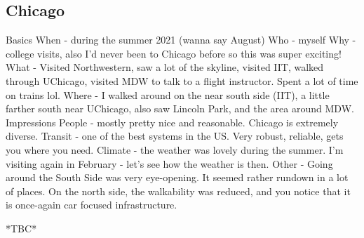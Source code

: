\documentclass{article}
\begin{document}
    \subsection{Chicago}
    \begin{outline}
        \1 Basics 
            \2 When - during the summer 2021 (wanna say August)
            \2 Who - myself 
            \2 Why - college visits, also I'd never been to Chicago before so this was super exciting!
            \2 What - Visited Northwestern, saw a lot of the skyline, visited IIT, walked through UChicago, visited MDW to talk to a flight instructor. Spent a lot of time on trains lol. 
            \2 Where - I walked around on the near south side (IIT), a little farther south near UChicago, also saw Lincoln Park, and the area around MDW. 
        \1 Impressions
            \2 People - mostly pretty nice and reasonable. Chicago is extremely diverse. 
            \2 Transit - one of the best systems in the US. Very robust, reliable, gets you where you need. 
            \2 Climate - the weather was lovely during the summer. I'm visiting again in February - let's see how the weather is then. 
            \2 Other - Going around the South Side was very eye-opening. It seemed rather rundown in a lot of places. On the north side, the walkability was reduced, and you notice that it is once-again car focused infrastructure. 
    \end{outline}
    *TBC*
\end{document}
